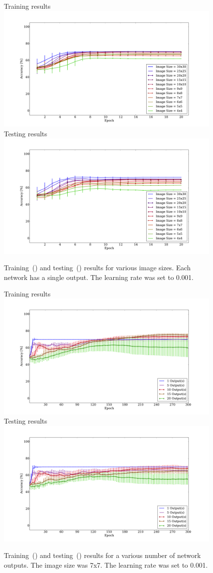 \documentclass[10pt,journal]{IEEEtran}
\begin{document}
				\begin{figure}[t!]
					\captionsetup[subfigure]{position=b}
					\centering
					\hfill
					\subcaptionbox
					{
						Training results
						\label{fig:sw_img:training}
					}
					{\includegraphics[width=0.49\linewidth]{sw_img_training}}
					\hfill
					\subcaptionbox
					{
						Testing results
						\label{fig:sw_img:testing}
					}
					{\includegraphics[width=0.49\linewidth]{sw_img_testing}}
					\hfill
					\caption{Training~() and testing~() results for various image sizes. Each network has a single output. The learning rate was set to 0.001.}
					\label{fig:sw_img}
				\end{figure}
				
				\begin{figure}[t!]
					\captionsetup[subfigure]{position=b}
					\centering
					\hfill
					\subcaptionbox
					{
						Training results
						\label{fig:sw_outputs:training}
					}
					{\includegraphics[width=0.49\linewidth]{sw_outputs_training}}
					\hfill
					\subcaptionbox
					{
						Testing results
						\label{fig:sw_outputs:testing}
					}
					{\includegraphics[width=0.49\linewidth]{sw_outputs_testing}}
					\hfill
					\caption{Training~() and testing~() results for a various number of network outputs. The image size was 7x7. The learning rate was set to 0.001.}
					\label{fig:sw_outputs}
				\end{figure}
				
\end{document}
